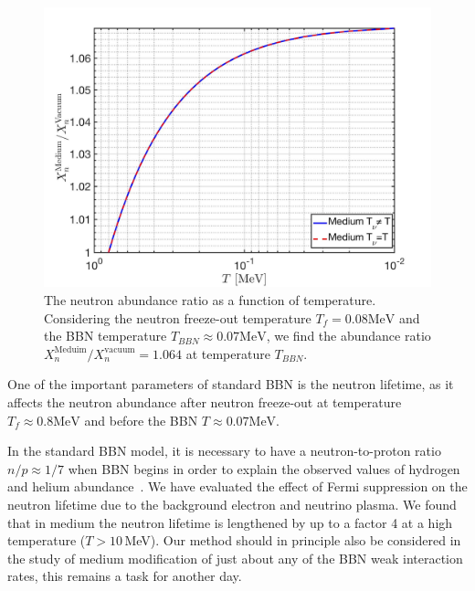 \begin{figure} 
\centerline{\includegraphics[width=0.9\linewidth]{./plots/Neutron_Abundance}}
\caption{The neutron abundance ratio as a function of temperature. Considering the neutron freeze-out temperature $T_f=0.08\mathrm{MeV}$ and the BBN temperature $T_{BBN}\approx0.07\mathrm{MeV}$, we find the abundance ratio ${X_n^{\mathrm{Meduim}}}/{X_n^{\mathrm{vacuum}}}=1.064$ at temperature $T_{BBN}$. }
\label{Neutron:Abundance} 
\end{figure}

One of the important parameters of standard BBN is the neutron lifetime, as it affects the neutron abundance after neutron freeze-out at temperature $T_f\approx 0.8 \mathrm{MeV}$ and before the BBN $T\approx0.07 \mathrm{MeV}$. 

In the standard BBN model, it is necessary to have a neutron-to-proton ratio $n/p\approx1/7$ when BBN begins in order to explain the observed values of hydrogen and helium abundance~\cite{Pitrou:2018cgg}. We have evaluated the effect of Fermi suppression on the neutron lifetime due to the background electron and neutrino plasma. We found that in medium the neutron lifetime is lengthened by up to a factor 4 at a high temperature ($T>10$\,MeV). Our method should in principle also be considered in the study of medium modification of just about any of the BBN weak interaction rates, this remains a task for another day.

